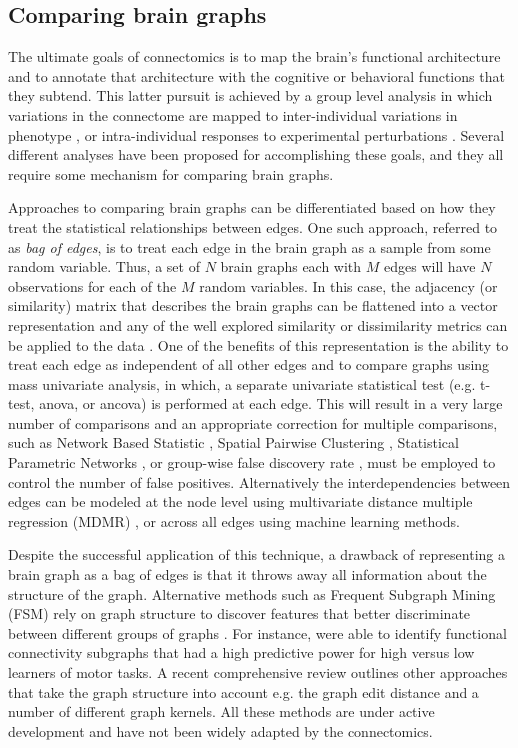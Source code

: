 \subsection{Comparing brain graphs} 

The ultimate goals of connectomics is to map the brain's functional architecture and to annotate that architecture with the cognitive or behavioral functions that they subtend. This latter pursuit is achieved by a group level analysis in which variations in the connectome are mapped to inter-individual variations in phenotype \cite{Kelly2011}, or intra-individual responses to experimental perturbations \cite{Shirer}. Several different analyses have been proposed for accomplishing these goals, and they all require some mechanism for comparing brain graphs. 
 
Approaches to comparing brain graphs can be differentiated based on how they treat the statistical relationships between edges. One such approach, referred to as \emph{bag of edges}, is to treat each edge in the brain graph as a sample from some random variable. Thus, a set of $N$ brain graphs each with $M$ edges will have $N$ observations for each of the $M$ random variables. In this case, the adjacency (or similarity) matrix that describes the brain graphs can be flattened into a vector representation and any of the well explored similarity or dissimilarity metrics can be applied to the data \cite{Ravindran}. One of the benefits of this representation is the ability to treat each edge as independent of all other edges and to compare graphs using mass univariate analysis, in which, a separate univariate statistical test (e.g. t-test, anova, or ancova) is performed at each edge. This will result in a very large number of comparisons and an appropriate correction for multiple comparisons, such as Network Based Statistic \cite{Zalesky2011}, Spatial Pairwise Clustering \cite{Zalesky2012}, Statistical Parametric Networks \cite{Ginestet2013}, or group-wise false discovery rate \cite{}, must be employed to control the number of false positives. Alternatively the interdependencies between edges can be modeled at the node level using multivariate distance multiple regression (MDMR) \cite{Shehzad2014}, or across all edges using machine learning methods\cite{Craddock2009, Dosenbach2010, Richiardi2011}.

Despite the successful application of this technique, a drawback of representing a brain graph as a bag of edges is that it throws away all information about the structure of the graph. Alternative methods such as Frequent Subgraph Mining (FSM) rely on graph structure to discover features that better discriminate between different groups of graphs \cite{Harrison2013}. For instance, \cite{Bogdanov2014} were able to identify functional connectivity subgraphs that had a high predictive power for high versus low learners of motor tasks. A recent comprehensive review \cite{Richiardi2013} outlines other approaches that take the graph structure into account e.g. the graph edit distance and a number of different graph kernels. All these methods are under active development and have not been widely adapted by the connectomics.

